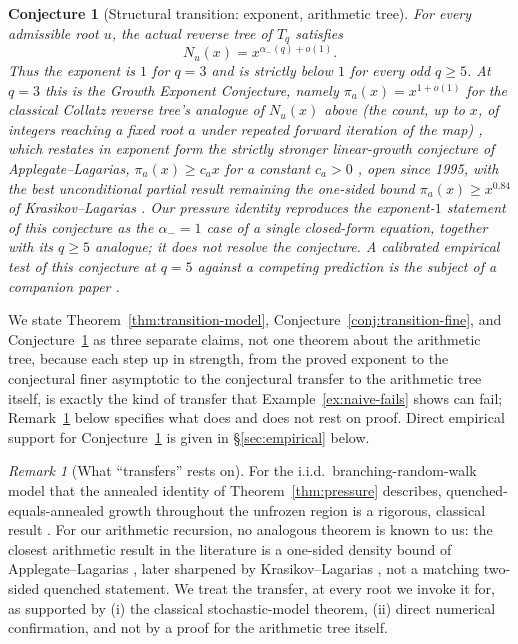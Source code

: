 \documentclass[11pt]{article}
\newtheorem{conjecture}[theorem]{Conjecture}
\theoremstyle{remark}
\newtheorem{remark}[theorem]{Remark}
\begin{document}
\begin{conjecture}[Structural transition: exponent, arithmetic tree]\label{conj:transition-arithmetic}
For every admissible root $u$, the actual reverse tree of $T_q$
satisfies
\[
 N_u(x)=x^{\alpha_-(q)+o(1)}.
\]
Thus the exponent is $1$ for $q=3$ and is strictly below $1$ for every
odd $q\ge5$. At $q=3$ this is the Growth Exponent Conjecture, namely
$\pi_a(x)=x^{1+o(1)}$ for the classical Collatz reverse tree's analogue
of $N_u(x)$ above (the count, up to $x$, of integers reaching a
fixed root $a$ under repeated forward iteration of the map)
\cite[Conjecture~2.1]{KontorovichLagarias2010}, which restates in
exponent form the strictly stronger linear-growth conjecture of
Applegate--Lagarias, $\pi_a(x)\ge c_ax$ for a constant $c_a>0$
\cite[Conjecture~A]{ApplegateLagarias1995I}, open
since 1995, with the best unconditional partial result remaining the
one-sided bound $\pi_a(x)\ge x^{0.84}$ of Krasikov--Lagarias
\cite{KrasikovLagarias2003}. Our pressure identity reproduces the
exponent-$1$ statement of this conjecture as the $\alpha_-=1$ case of
a single closed-form equation, together with its $q\ge5$ analogue; it
does not resolve the conjecture. A calibrated empirical test of this
conjecture at $q=5$ against a competing prediction is the subject of a
companion paper \cite{KLVolkovCompanion}.
\end{conjecture}

We state Theorem~\ref{thm:transition-model},
Conjecture~\ref{conj:transition-fine}, and
Conjecture~\ref{conj:transition-arithmetic} as three separate claims,
not one theorem about the arithmetic tree, because each step up in
strength, from the proved exponent to the conjectural finer asymptotic
to the conjectural transfer to the arithmetic tree itself, is exactly
the kind of transfer that
Example~\ref{ex:naive-fails} shows can fail;
Remark~\ref{rem:transfer-basis} below specifies what does and does
not rest on proof. Direct empirical support for
Conjecture~\ref{conj:transition-arithmetic} is given in
\S\ref{sec:empirical} below.

\begin{remark}[What ``transfers'' rests on]\label{rem:transfer-basis}
For the i.i.d.\ branching-random-walk model that the annealed
identity of Theorem~\ref{thm:pressure} describes, quenched-equals-annealed
growth throughout the unfrozen region is a rigorous, classical result
\cite{Biggins1992}. For our arithmetic recursion, no analogous theorem
is known to us: the closest arithmetic result in
the literature is a one-sided density bound of Applegate--Lagarias
\cite{ApplegateLagarias1995I,ApplegateLagarias1995II}, later sharpened
by Krasikov--Lagarias \cite{KrasikovLagarias2003}, not a matching
two-sided quenched statement. We treat the transfer, at every root we
invoke it for, as supported by (i) the classical stochastic-model
theorem, (ii) direct numerical confirmation, and not by a proof for the
arithmetic tree itself.
\end{remark}
\end{document}
